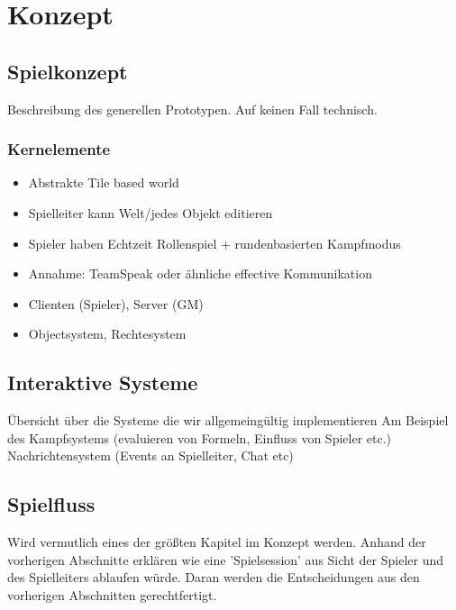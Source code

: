 \chapter{Konzept}
\label{concept}


\section{Spielkonzept}
\label{sec:Grobkonzept}
Beschreibung des generellen Prototypen. Auf keinen Fall technisch.

\subsection{Kernelemente}

\begin{itemize}
	\item Abstrakte Tile based world
	\item Spielleiter kann Welt/jedes Objekt editieren
	\item Spieler haben Echtzeit Rollenspiel + rundenbasierten Kampfmodus
	\item Annahme: TeamSpeak oder ähnliche effective Kommunikation
	\item Clienten (Spieler),  Server (GM)
	\item Objectsystem, Rechtesystem
\end{itemize}



\section{Interaktive Systeme}
\label{sec:InteraktiveSysteme}
Übersicht über die Systeme die wir allgemeingültig implementieren\newline
Am Beispiel des Kampfsystems (evaluieren von Formeln, Einfluss von Spieler etc.)\newline
Nachrichtensystem (Events an Spielleiter, Chat etc)\newline


\section{Spielfluss}
\label{sec:Spielfluss}
Wird vermutlich eines der größten Kapitel im Konzept werden. Anhand der vorherigen Abschnitte erklären wie eine 'Spielsession' aus Sicht der Spieler und des Spielleiters ablaufen würde. Daran werden die Entscheidungen aus den vorherigen Abschnitten gerechtfertigt.\newline
{}
